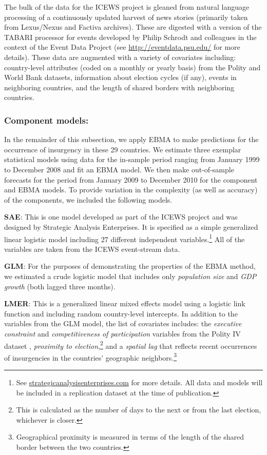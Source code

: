 \documentclass[12pt,fullpage]{article}
\newcommand{\note}[1]{\footnote{\doublespacing#1 \vspace{4 mm}}}
\begin{document}
The bulk of the data for the ICEWS project is gleaned from natural
language processing of a continuously updated harvest of news stories
(primarily taken from Lexus/Nexus and Factiva archives). These are
digested with a version of the TABARI processor for events developed
by Philip Schrodt and colleagues in the context of the Event Data
Project (see \url{http://eventdata.psu.edu/} for more details).  These
data are augmented with a variety of covariates including:
country-level attributes (coded on a monthly or yearly basis) from the
Polity and World Bank datasets, information about election cycles (if
any), events in neighboring countries, and the length of shared
borders with neighboring countries.

\subsubsection{Component models:}

In the remainder of this subsection, we apply EBMA to make predictions
for the occurrence of insurgency in these 29 countries.  We estimate
three exemplar statistical models using data for the in-sample period
ranging from January 1999 to December 2008 and fit an EBMA model.  We
then make out-of-sample forecasts for the period from January 2009 to
December 2010 for the component and EBMA models.  To provide variation
in the complexity (as well as accuracy) of the components, we included
the following models.

\begin{list}{}{\leftmargin=1em}
\item \textbf{SAE}: This is one model developed as part of the ICEWS
  project and was designed by Strategic Analysis Enterprises. It is
  specified as a simple generalized linear logistic model including 27 different
  independent variables.\note{See
    \url{strategicanalysisenterprises.com} for more details.  All data
    and models will be included in a replication dataset at the time
    of publication.}  All of the variables are taken from the ICEWS
  event-stream data.
\item \textbf{GLM}: For the purposes of demonstrating the properties
  of the EBMA method, we estimated a crude logistic model that
  includes only \textit{population size} and \textit{GDP growth} (both
  lagged three months).
\item \textbf{LMER}: This is a generalized linear mixed effects model
  using a logistic link function and including random country-level
  intercepts. In addition to the variables from the GLM model, the
  list of covariates includes: the \textit{executive constraint} and
  \textit{competitiveness of participation} variables from the Polity
  IV dataset \citep{PolityIV}, \textit{proximity to
    election},\note{This is calculated as the number of days to the
    next or from the last election, whichever is closer.} and a
  \textit{spatial lag} that reflects recent occurrences of
  insurgencies in the countries' geographic
  neighbors.\note{Geographical proximity is measured in terms of the
    length of the shared border between the two countries.}
\end{list}
\end{document}
